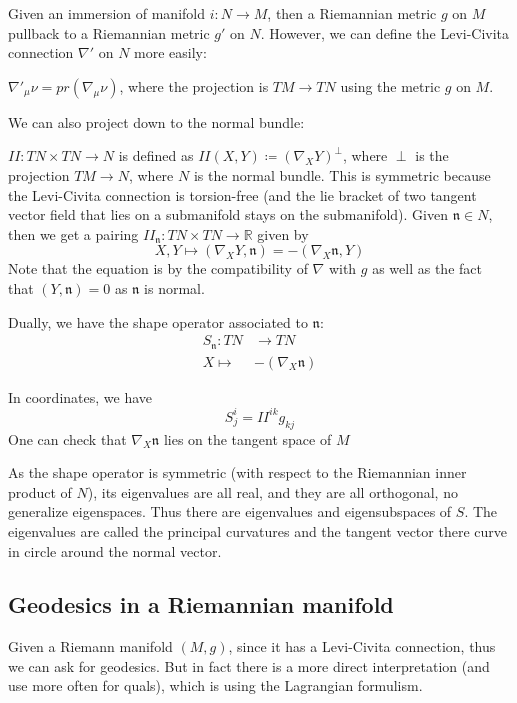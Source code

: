 \documentclass[main.tex]{subfiles}
\begin{document}
Given an immersion of manifold $i: N \rightarrow M$, then a Riemannian metric $g$ on $M$ pullback to a Riemannian metric $g'$ on $N$. However, we can define the Levi-Civita connection
$\nabla'$ on $N$ more easily:
\begin{lemma}
$\nabla'_{\mu} \nu = pr (\nabla_{\mu} \nu)$, where the projection is $TM \rightarrow TN$ using the metric $g$ on $M$. 
\end{lemma}

We can also project down to the normal bundle:
\begin{definition}
$II: TN \times TN \rightarrow N$ is defined as $II(X, Y) \coloneqq (\nabla_{X} Y)^\perp$, where $\perp$ is the projection $TM \rightarrow N$, where $N$ is the normal bundle. This is symmetric because the Levi-Civita connection is torsion-free (and the lie bracket of two tangent vector field that lies on a submanifold stays on the submanifold).
Given $\mathfrak{n} \in N$, then we get a pairing $II_\mathfrak{n}: TN \times TN \rightarrow \mathbb{R}$ given by 
$$
X, Y \mapsto (\nabla_{X} Y, \mathfrak{n}) = - (\nabla_{X} \mathfrak{n}, Y)
$$
Note that the equation is by the compatibility of $\nabla$ with $g$ as well as the fact that $(Y, \mathfrak{n}) = 0$ as $\mathfrak{n}$ is normal.

Dually, we have the shape operator associated to $\mathfrak{n}$: 
\begin{align*}
S_{\mathfrak{n}}: TN &\rightarrow TN \\ 
X  \mapsto & - (\nabla_{X} \mathfrak{n}) 
\end{align*}
\end{definition}

In coordinates, we have 
$$
S^i _j =  II^{ik} g_{kj}
$$
One can check that $\nabla_{X} \mathfrak{n}$ lies on the tangent space of $M$

As the shape operator is symmetric (with respect to the Riemannian inner product of $N$), its eigenvalues are all real, and they are all orthogonal, no generalize eigenspaces. Thus there are eigenvalues and eigensubspaces of $S$. The eigenvalues are called the principal curvatures and the tangent vector there curve in circle around the normal vector.

\subsection{Geodesics in a Riemannian manifold}
Given a Riemann manifold $(M, g)$, since it has a Levi-Civita connection, thus we can ask for geodesics. But in fact there is a more direct interpretation (and use more often for quals), which is using the Lagrangian formulism.
\end{document}
